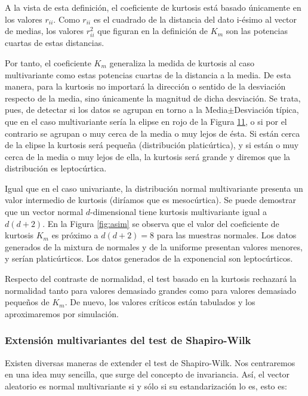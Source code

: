 \documentclass[
  a4paper,
  oneside]{scrbook}
\theoremstyle{definition}
\theoremstyle{definition}
\theoremstyle{definition}
\theoremstyle{definition}
\theoremstyle{remark}
\begin{document}
A la vista de esta definición, el coeficiente de kurtosis está basado
únicamente en los valores \(r_{ii}\). Como \(r_{ii}\) es el cuadrado de la
distancia del dato i-ésimo al vector de medias, los valores \(r_{ii}^2\)
que figuran en la definición de \(K_m\) son las potencias cuartas de estas
distancias.

Por tanto, el coeficiente \(K_m\) generaliza la medida de kurtosis al caso
multivariante como estas potencias cuartas de la distancia a la media.
De esta manera, para la kurtosis no importará la dirección o sentido de
la desviación respecto de la media, sino únicamente la magnitud de dicha
desviación. Se trata, pues, de detectar si los datos se agrupan en torno
a la Media\(\pm\)Desviación típica, que en el caso multivariante sería la
elipse en rojo de la Figura \hyperref[fig:asim]{11}, o si por el contrario se agrupan o muy cerca de
la media o muy lejos de ésta. Si están cerca de la elipse la kurtosis
será pequeña (distribución platicúrtica), y si están o muy cerca de la
media o muy lejos de ella, la kurtosis será grande y diremos que la
distribución es leptocúrtica.

Igual que en el caso univariante, la distribución normal multivariante
presenta un valor intermedio de kurtosis (diríamos que es mesocúrtica).
Se puede demostrar que un vector normal \(d\)-dimensional tiene kurtosis
multivariante igual a \(d(d+2)\). En la Figura
\ref{fig:asim} se observa
que el valor del coeficiente de kurtosis \(K_m\) es próximo a \(d(d+2)=8\)
para las muestras normales. Los datos generados de la mixtura de
normales y de la uniforme presentan valores menores, y serían
platicúrticos. Los datos generados de la exponencial son leptocúrticos.

Respecto del contraste de normalidad, el test basado en la kurtosis
rechazará la normalidad tanto para valores demasiado grandes como para
valores demasiado pequeños de \(K_m\). De nuevo, los valores críticos
están tabulados y los aproximaremos por simulación.

\subsubsection{Extensión multivariantes del test de Shapiro-Wilk}\label{extension-multivariantes-del-test-de-shapiro-wilk}

Existen diversas maneras de extender el test de Shapiro-Wilk. Nos
centraremos en una idea muy sencilla, que surge del concepto de
invariancia. Así, el vector aleatorio es normal multivariante si y sólo
si su estandarización lo es, esto es:
\end{document}
